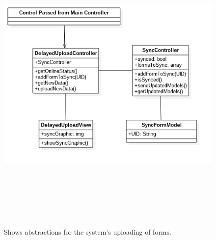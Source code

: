 \documentclass[twoside,letterpaper]{article}
\begin{document}
\begin{figure}[H]
\centering
\includegraphics[width=6in,height=6in]{Delayed_Upload_UML.png}
\caption{Shows abstractions for the system's uploading of forms.}
\end{figure}
\end{document}

